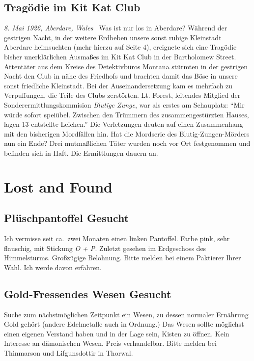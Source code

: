 \documentclass[final]{multiversum}
\begin{document}
\subsection{Tragödie im Kit Kat Club}
\textit{8. Mai 1926, Aberdare, Wales} \textendash\ Was ist nur los in Aberdare?
Während der gestrigen Nacht, in der weitere Erdbeben unsere sonst ruhige
Kleinstadt Aberdare heimsuchten (mehr hierzu auf Seite 4), ereignete sich eine
Tragödie bisher unerklärlichen Ausmaßes im Kit Kat Club in der Bartholomew
Street. Attentäter aus dem Kreise des Detektivbüros Montana stürmten in der
gestrigen Nacht den Club in nähe des Friedhofs und brachten damit das Böse in
unsere sonst friedliche Kleinstadt. Bei der Auseinandersetzung kam es mehrfach
zu Verpuffungen, die Teile des Clubs zerstörten. Lt. Forest, leitendes Mitglied
der Sonderermittlungskommision \emph{Blutige Zunge}, war als erstes am
Schauplatz: \enquote{Mir würde sofort speiübel. Zwischen den Trümmern des
zusammengestürzten Hauses, lagen 13 entstellte Leichen.} Die Verletzungen deuten
auf einen Zusammenhang mit den bisherigen Mordfällen hin. Hat die Mordserie des
Blutig-Zungen-Mörders nun ein Ende? Drei mutmaßlichen Täter wurden noch vor Ort
festgenommen und befinden sich in Haft. Die Ermittlungen dauern an.


\section{Lost and Found}
\subsection{Plüschpantoffel Gesucht}
Ich vermisse seit ca.\ zwei Monaten einen linken Pantoffel.  Farbe pink, sehr
flauschig, mit Stickung \emph{O + P}.  Zuletzt gesehen im Erdgeschoss des
Himmelsturms.  Großzügige Belohnung.  Bitte melden bei einem Paktierer Ihrer Wahl.
Ich werde davon erfahren.

\subsection{Gold-Fressendes Wesen Gesucht}
Suche zum nächstmöglichen Zeitpunkt ein Wesen, zu dessen normaler Ernährung Gold
gehört (andere Edelmetalle auch in Ordnung.) Das Wesen sollte möglichst einen
eigenen Verstand haben und in der Lage sein, Kisten zu öffnen.  Kein Interesse
an dämonischen Wesen.  Preis verhandelbar.  Bitte melden bei Thinmarson und
Lifgunsdottir in Thorwal.
\end{document}
